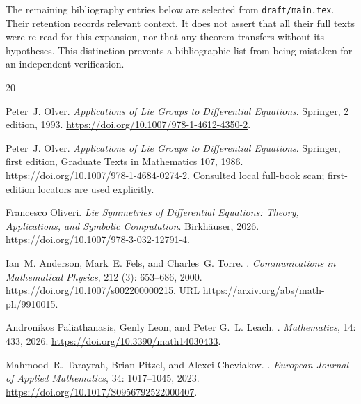 \documentclass[12pt,a4paper,oneside]{report}
\numberwithin{equation}{chapter}
\DeclareRobustCommand{\code}[1]{\nolinkurl{#1}}
\begin{document}
The remaining bibliography entries below are selected from
\code{draft/main.tex}. Their retention records relevant context. It does not
assert that all their full texts were re-read for this expansion, nor that
any theorem transfers without its hypotheses. This distinction prevents a
bibliographic list from being mistaken for an independent verification.

\clearpage
{}
\begingroup\small\singlespacing
\setlength{\bibsep}{3pt plus 1pt minus 1pt}
\begin{thebibliography}{20}
\providecommand{\natexlab}[1]{#1}
\newcommand{\doi}[1]{\url{https://doi.org/#1}}

Peter~J. Olver.
\newblock \emph{{Applications of Lie Groups to Differential Equations}}.
\newblock Springer, 2 edition, 1993.
\newblock \doi{10.1007/978-1-4612-4350-2}.

Peter~J. Olver.
\newblock \emph{Applications of Lie Groups to Differential Equations}.
\newblock Springer, first edition, Graduate Texts in Mathematics 107, 1986.
\newblock \doi{10.1007/978-1-4684-0274-2}.
\newblock Consulted local full-book scan; first-edition locators are used explicitly.


Francesco Oliveri.
\newblock \emph{{Lie Symmetries of Differential Equations: Theory,
  Applications, and Symbolic Computation}}.
\newblock Birkh{\"a}user, 2026.
\newblock \doi{10.1007/978-3-032-12791-4}.

Ian~M. Anderson, Mark~E. Fels, and Charles~G. Torre.
.
\newblock \emph{Communications in Mathematical Physics}, 212
  (3): 653--686, 2000.
\newblock \doi{10.1007/s002200000215}.
\newblock URL \url{https://arxiv.org/abs/math-ph/9910015}.

Andronikos Paliathanasis, Genly Leon, and Peter G.~L. Leach.
.
\newblock \emph{Mathematics}, 14: 433, 2026.
\newblock \doi{10.3390/math14030433}.

Mahmood~R. Tarayrah, Brian Pitzel, and Alexei Cheviakov.
.
\newblock \emph{European Journal of Applied Mathematics}, 34:
  1017--1045, 2023.
\newblock \doi{10.1017/S0956792522000407}.


\end{thebibliography}
\end{document}
